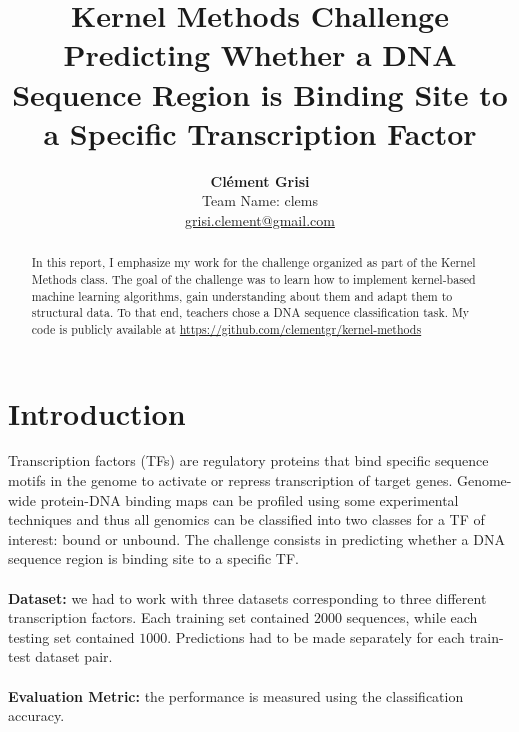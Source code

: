 \documentclass[final]{cvpr}
\begin{document}
	
	\title{ Kernel Methods Challenge\\
		\vspace{1mm}
		\large \normalfont Predicting Whether a DNA Sequence Region is Binding Site to a Specific Transcription Factor}
	
	\author{\textbf{Clément Grisi}\\
		Team Name: clems\\
		\small \url{grisi.clement@gmail.com}
	}
	
	\maketitle
	
	\begin{abstract}
		In this report, I emphasize my work for the challenge organized as part of the Kernel Methods class. The goal of the challenge was to learn how to implement kernel-based machine learning algorithms, gain understanding about them and adapt them to structural data. To that end, teachers chose a DNA sequence classification task. My code is publicly available at \small{\url{https://github.com/clementgr/kernel-methods}}
	\end{abstract}
	
	\vspace{-3mm}
	
	\section{Introduction}
	
	Transcription factors (TFs) are regulatory proteins that bind specific sequence motifs in the genome to activate or repress transcription of target genes. Genome-wide protein-DNA binding maps can be profiled using some experimental techniques and thus all genomics can be classified into two classes for a TF of interest: bound or unbound. The challenge consists in predicting whether a DNA sequence region is binding site to a specific TF.\\
	\\
	\textbf{Dataset:} we had to work with three datasets corresponding to three different transcription factors. Each training set contained $2000$ sequences, while each testing set contained $1000$. Predictions had to be made separately for each train-test dataset pair.\\
	\\
	\textbf{Evaluation Metric:} the performance is measured using the classification accuracy.
	
\end{document}
